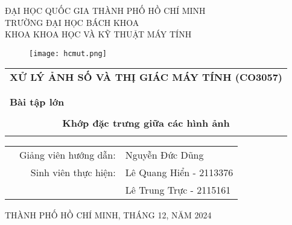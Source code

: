 \documentclass[a4paper]{article}
\begin{document}
	
	\begin{titlepage}
		\begin{center}
			ĐẠI HỌC QUỐC GIA THÀNH PHỐ HỒ CHÍ MINH \\
			TRƯỜNG ĐẠI HỌC BÁCH KHOA \\
			KHOA KHOA HỌC VÀ KỸ THUẬT MÁY TÍNH
		\end{center}
		
		\vspace{1cm}
		
		\begin{figure}[h!]
			\begin{center}
				\texttt{[image: hcmut.png]}
			\end{center}
		\end{figure}
		
		\vspace{1cm}
		
		
		\begin{center}
			\begin{tabular}{c}
				
				\multicolumn{1}{l}{\textbf{{\Large XỬ LÝ ẢNH SỐ VÀ THỊ GIÁC MÁY TÍNH (CO3057)}}}\\
				\\
				\hline
				\\
				\multicolumn{1}{l}{\textbf{{\Large Bài tập lớn}}}\\
				\\
				\textbf{{\Huge Khớp đặc trưng giữa các hình ảnh}}\\
				\\
				\hline
			\end{tabular}
		\end{center}
		
		\vspace{3cm}
		
		\begin{table}[h]
			\begin{tabular}{rrl}
				\hspace{5 cm} & Giảng viên hướng dẫn: & Nguyễn Đức Dũng\\
				& Sinh viên thực hiện: & Lê Quang Hiển - 2113376 \\
				& & Lê Trung Trực - 2115161 \\
			\end{tabular}
		\end{table}
		
		\begin{center}
			{\footnotesize THÀNH PHỐ HỒ CHÍ MINH, THÁNG 12, NĂM 2024}
		\end{center}
	\end{titlepage}
	
\end{document}
